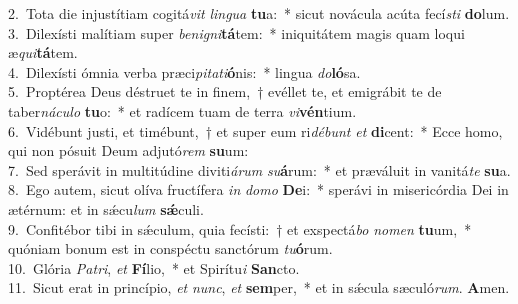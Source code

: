 {2.~}Tota die injustítiam cogitá\textit{vit} \textit{lin}\textit{gua} \textbf{tu}a:~* sicut novácula acúta fecí\textit{sti} \textbf{do}lum.\\
{3.~}Dilexísti malítiam super \textit{be}\textit{ni}\textit{gni}\textbf{tá}tem:~* iniquitátem magis quam loqui æ\textit{qui}\textbf{tá}tem.\\
{4.~}Dilexísti ómnia verba præci\textit{pi}\textit{ta}\textit{ti}\textbf{ó}nis:~* lingua \textit{do}\textbf{ló}sa.\\
{5.~}Proptérea Deus déstruet te in finem,~† evéllet te, et emigrábit te de taber\textit{ná}\textit{cu}\textit{lo} \textbf{tu}o:~* et radícem tuam de terra \textit{vi}\textbf{vén}tium.\\
{6.~}Vidébunt justi, et timébunt,~† et super eum ri\textit{dé}\textit{bunt} \textit{et} \textbf{di}cent:~* Ecce homo, qui non pósuit Deum adjutó\textit{rem} \textbf{su}um:\\
{7.~}Sed sperávit in multitúdine diviti\textit{á}\textit{rum} \textit{su}\textbf{á}rum:~* et præváluit in vanitá\textit{te} \textbf{su}a.\\
{8.~}Ego autem, sicut olíva fructífera \textit{in} \textit{do}\textit{mo} \textbf{De}i:~* sperávi in misericórdia Dei in ætérnum: et in sǽcu\textit{lum} \textbf{sǽ}culi.\\
{9.~}Confitébor tibi in sǽculum, quia fecísti:~† et exspectá\textit{bo} \textit{no}\textit{men} \textbf{tu}um,~* quóniam bonum est in conspéctu sanctórum \textit{tu}\textbf{ó}rum.\\
{10.~}Glória \textit{Pa}\textit{tri}, \textit{et} \textbf{Fí}lio,~* et Spirítu\textit{i} \textbf{San}cto.\\
{11.~}Sicut erat in princípio, \textit{et} \textit{nunc}, \textit{et} \textbf{sem}per,~* et in sǽcula sæculó\textit{rum}. \textbf{A}men.\\

